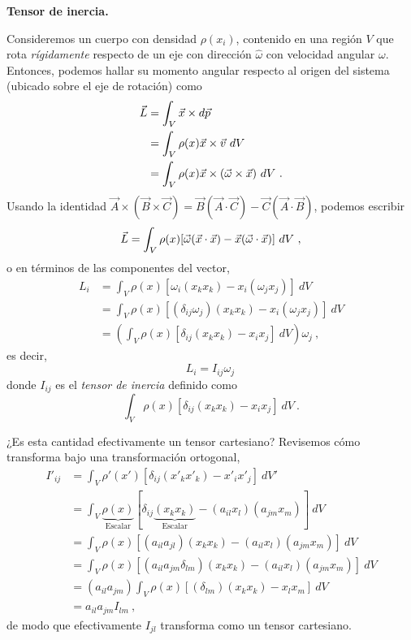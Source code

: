 \begin{ejemplo}
    \textbf{Tensor de inercia.}

    Consideremos un cuerpo con densidad $\rho(x_i)$, contenido en una región $V$ que rota \emph{rígidamente} respecto de un eje con dirección $\hat{\omega}$ con velocidad angular $\omega$. Entonces, podemos hallar su momento angular respecto al origen del sistema (ubicado sobre el eje de rotación) como
    \begin{align*}
        \vec{L} & = \int_V \x \times d\vec{p} \\
        & = \int_V \rho(x) \x \times \vec{v} \ dV \\
        & = \int_V \rho(x) \x \times (\vec{\omega} \times \x) \ dV \ .
    \end{align*}
    Usando la identidad $\vec{A} \times (\vec{B} \times \vec{C}) = \vec{B} (\vec{A} \cdot \vec{C}) - \vec{C} (\vec{A} \cdot \vec{B})$, podemos escribir
    \begin{equation*}
        \vec{L} = \int_V \rho(x) [\vec{\omega}(\x \cdot \x) - \x (\vec{\omega} \cdot \x)] \ dV \ ,
    \end{equation*}
    o en términos de las componentes del vector,
    \begin{align*}
        L_i & = \int_V \rho(x) [\omega_i(x_k x_k) - x_i(\omega_j x_j)] \ dV \\
        & = \int_V \rho(x) [(\delta_{ij} \omega_j)(x_k x_k) - x_i(\omega_j x_j)] \ dV \\
        & = \left( \int_V \rho(x) [\delta_{ij} (x_k x_k) - x_i x_j] \ dV \right) \omega_j \ ,
    \end{align*}
    es decir, 
    \begin{equation*}
        L_i = I_{ij} \omega_j \, 
    \end{equation*}
    donde $I_{ij}$ es el \emph{tensor de inercia} definido como
    \begin{equation*}
        \int_V \rho(x) [\delta_{ij} (x_k x_k) - x_i x_j] \ dV \ .
    \end{equation*}

    ¿Es esta cantidad efectivamente un tensor cartesiano? Revisemos cómo transforma bajo una transformación ortogonal,
    \begin{align*}
        I'_{ij} & = \int_V \rho'(x') [\delta_{ij} (x'_k x'_k) - x'_i x'_j] \ dV' \\
        & = \int_V \underbrace{\rho(x)}_{\text{Escalar}} [\delta_{ij}\underbrace{(x_k x_k)}_\text{Escalar} - (a_{il} x_l)(a_{jm} x_m)] \ dV \\
        & = \int_V \rho(x) [(a_{il}a_{jl})(x_k x_k) - (a_{il} x_l)(a_{jm} x_m)] \ dV \\
        & = \int_V \rho(x) [(a_{il}a_{jm}\delta_{lm})(x_k x_k) - (a_{il} x_l)(a_{jm} x_m)] \ dV \\
        & = (a_{il} a_{jm}) \int_V \rho(x) [(\delta_{lm})(x_k x_k) - x_l x_m] \ dV \\
        & = a_{il} a_{jm} I_{lm} \ ,
    \end{align*}
    de modo que efectivamente $I_{jl}$ transforma como un tensor cartesiano.
\end{ejemplo}

